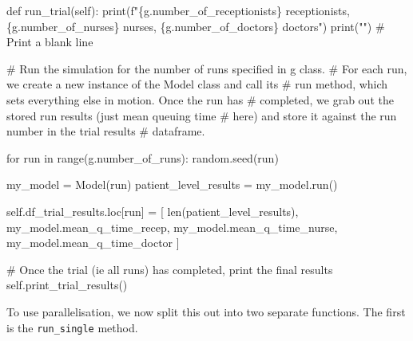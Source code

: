 \documentclass[
  letterpaper,
  DIV=11,
  numbers=noendperiod]{scrreprt}
\newenvironment{Shaded}{}{}
\newcommand{\BuiltInTok}[1]{\textcolor[rgb]{0.84,0.23,0.29}{#1}}
\newcommand{\CommentTok}[1]{\textcolor[rgb]{0.42,0.45,0.49}{#1}}
\newcommand{\ControlFlowTok}[1]{\textcolor[rgb]{0.84,0.23,0.29}{#1}}
\newcommand{\KeywordTok}[1]{\textcolor[rgb]{0.84,0.23,0.29}{#1}}
\newcommand{\NormalTok}[1]{\textcolor[rgb]{0.14,0.16,0.18}{#1}}
\newcommand{\OperatorTok}[1]{\textcolor[rgb]{0.14,0.16,0.18}{#1}}
\newcommand{\SpecialCharTok}[1]{\textcolor[rgb]{0.00,0.36,0.77}{#1}}
\newcommand{\SpecialStringTok}[1]{\textcolor[rgb]{0.01,0.18,0.38}{#1}}
\newcommand{\StringTok}[1]{\textcolor[rgb]{0.01,0.18,0.38}{#1}}
\newcommand{\VariableTok}[1]{\textcolor[rgb]{0.89,0.38,0.04}{#1}}
\begin{document}
\begin{Shaded}
\begin{Highlighting}[]
\KeywordTok{def}\NormalTok{ run\_trial(}\VariableTok{self}\NormalTok{):}
        \BuiltInTok{print}\NormalTok{(}\SpecialStringTok{f"}\SpecialCharTok{\{}\NormalTok{g}\SpecialCharTok{.}\NormalTok{number\_of\_receptionists}\SpecialCharTok{\}}\SpecialStringTok{ receptionists, }\SpecialCharTok{\{}\NormalTok{g}\SpecialCharTok{.}\NormalTok{number\_of\_nurses}\SpecialCharTok{\}}\SpecialStringTok{ nurses, }\SpecialCharTok{\{}\NormalTok{g}\SpecialCharTok{.}\NormalTok{number\_of\_doctors}\SpecialCharTok{\}}\SpecialStringTok{ doctors"}\NormalTok{)}
        \BuiltInTok{print}\NormalTok{(}\StringTok{""}\NormalTok{) }\CommentTok{\# Print a blank line}

        \CommentTok{\# Run the simulation for the number of runs specified in g class.}
        \CommentTok{\# For each run, we create a new instance of the Model class and call its}
        \CommentTok{\# run method, which sets everything else in motion.  Once the run has}
        \CommentTok{\# completed, we grab out the stored run results (just mean queuing time}
        \CommentTok{\# here) and store it against the run number in the trial results}
        \CommentTok{\# dataframe.}

        \ControlFlowTok{for}\NormalTok{ run }\KeywordTok{in} \BuiltInTok{range}\NormalTok{(g.number\_of\_runs):}
\NormalTok{            random.seed(run)}

\NormalTok{            my\_model }\OperatorTok{=}\NormalTok{ Model(run)}
\NormalTok{            patient\_level\_results }\OperatorTok{=}\NormalTok{ my\_model.run()}

            \VariableTok{self}\NormalTok{.df\_trial\_results.loc[run] }\OperatorTok{=}\NormalTok{ [}
                \BuiltInTok{len}\NormalTok{(patient\_level\_results),}
\NormalTok{                my\_model.mean\_q\_time\_recep,}
\NormalTok{                my\_model.mean\_q\_time\_nurse,}
\NormalTok{                my\_model.mean\_q\_time\_doctor}
\NormalTok{                ]}

        \CommentTok{\# Once the trial (ie all runs) has completed, print the final results}
        \VariableTok{self}\NormalTok{.print\_trial\_results()}
\end{Highlighting}
\end{Shaded}

To use parallelisation, we now split this out into two separate
functions. The first is the \texttt{run\_single} method.
\end{document}
